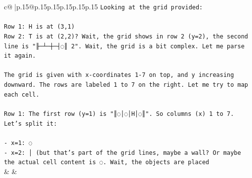 \documentclass{article}
\begin{document}
{\begin{supertabular}{c@{$\;$}|p{.15\linewidth}@{}p{.15\linewidth}p{.15\linewidth}p{.15\linewidth}p{.15\linewidth}p{.15\linewidth}}
{{{\texttt{Looking at the grid provided:} \\
\\ 
\texttt{Row 1: H is at (3,1)} \\
\texttt{Row 2: T is at (2,2)? Wait, the grid shows in row 2 (y=2), the second line is "╟─┴─┼─┤◌║ 2". Wait, the grid is a bit complex. Let me parse it again.} \\
\\ 
\texttt{The grid is given with x{-}coordinates 1{-}7 on top, and y increasing downward. The rows are labeled 1 to 7 on the right. Let me try to map each cell.} \\
\\ 
\texttt{Row 1: The first row (y=1) is "║◌│◌│H│◌║". So columns (x) 1 to 7. Let's split it:} \\
\\ 
\texttt{{-} x=1: ◌} \\
\texttt{{-} x=2: │ (but that's part of the grid lines, maybe a wall? Or maybe the actual cell content is ◌. Wait, the objects are placed} \\
            }
        }
    }
    & & \\ \\


\end{supertabular}}
\end{document}
